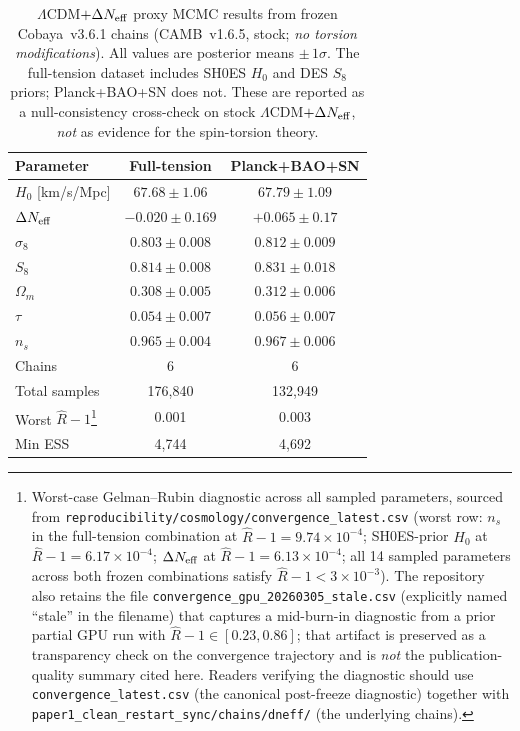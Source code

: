 \documentclass[aps,prd,twocolumn,superscriptaddress,showpacs,preprintnumbers,nofootinbib,longbibliography,floatfix]{revtex4-2}
\newcommand{\Neff}{N_{\rm eff}}
\begin{document}
\begin{table}[t]
\caption{\label{tab:verification} $\Lambda$CDM$+\Delta\Neff$ proxy MCMC results from frozen Cobaya~v3.6.1 chains (CAMB~v1.6.5, stock; \emph{no torsion modifications}). All values are posterior means $\pm\,1\sigma$. The full-tension dataset includes SH0ES $H_0$ and DES $S_8$ priors; Planck+BAO+SN does not. These are reported as a null-consistency cross-check on stock $\Lambda$CDM$+\Delta\Neff$, \emph{not} as evidence for the spin-torsion theory.}
\begin{ruledtabular}
\begin{tabular}{lcc}
Parameter & Full-tension & Planck+BAO+SN \\
\hline
$H_0$ [km/s/Mpc] & $67.68 \pm 1.06$ & $67.79 \pm 1.09$ \\
$\Delta\Neff$ & $-0.020 \pm 0.169$ & $+0.065 \pm 0.17$ \\
$\sigma_8$ & $0.803 \pm 0.008$ & $0.812 \pm 0.009$ \\
$S_8$ & $0.814 \pm 0.008$ & $0.831 \pm 0.018$ \\
$\Omega_m$ & $0.308 \pm 0.005$ & $0.312 \pm 0.006$ \\
$\tau$ & $0.054 \pm 0.007$ & $0.056 \pm 0.007$ \\
$n_s$ & $0.965 \pm 0.004$ & $0.967 \pm 0.006$ \\
\hline
Chains & 6 & 6 \\
Total samples & 176{,}840 & 132{,}949 \\
Worst $\hat{R}-1$\footnote{\label{fn:rhat_csv}Worst-case Gelman--Rubin diagnostic across all sampled parameters, sourced from \texttt{reproducibility/cosmology/convergence\_latest.csv} (worst row: $n_s$ in the full-tension combination at $\hat{R}-1 = 9.74\times 10^{-4}$; SH0ES-prior $H_0$ at $\hat{R}-1 = 6.17\times 10^{-4}$; $\Delta\Neff$ at $\hat{R}-1 = 6.13\times 10^{-4}$; all 14 sampled parameters across both frozen combinations satisfy $\hat{R}-1 < 3\times 10^{-3}$). The repository also retains the file \texttt{convergence\_gpu\_20260305\_stale.csv} (explicitly named ``stale'' in the filename) that captures a mid-burn-in diagnostic from a prior partial GPU run with $\hat{R}-1 \in [0.23, 0.86]$; that artifact is preserved as a transparency check on the convergence trajectory and is \emph{not} the publication-quality summary cited here. Readers verifying the diagnostic should use \texttt{convergence\_latest.csv} (the canonical post-freeze diagnostic) together with \texttt{paper1\_clean\_restart\_sync/chains/dneff/} (the underlying chains).} & 0.001 & 0.003 \\
Min ESS & 4{,}744 & 4{,}692 \\
\end{tabular}
\end{ruledtabular}
\end{table}
\end{document}
